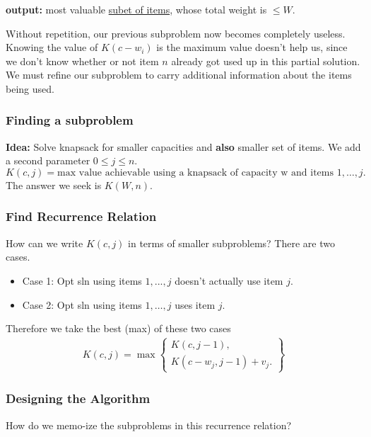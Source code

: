 \documentclass[12pt]{article}
\begin{document}
\textbf{output: } most valuable \underline{subet of items}, whose total weight is $\le W$.


Without repetition, our previous subproblem now becomes completely useless. Knowing the value of $K(c - w_i)$ is the maximum value doesn't help us, since we don't know whether or not item $n$ already got used up in this partial solution. We must refine our subproblem to carry additional information about the items being used.

\subsubsection{Finding a subproblem}
\textbf{Idea:} Solve knapsack for smaller capacities and \textbf{also} smaller set of items.
We add a second parameter $0 \le j \le n$.
$$
    K(c, j) = \text{max value achievable using a knapsack of capacity w and items } 1, \dots, j.
$$
The answer we seek is $K(W, n)$.
\subsubsection{Find Recurrence Relation}
How can we write $K(c, j)$ in terms of smaller subproblems? There are two cases.
\begin{itemize}
    \item Case 1: Opt sln using items $1, ..., j$ doesn't actually use item $j$.
    \item Case 2: Opt sln using items $1, \dots, j$ uses item $j$.
\end{itemize}
Therefore we take the best (max) of these two cases
\begin{align*}
    K(c, j) = \max \left\{
    \begin{array}{c}
        K(c, j - 1), \\
        K(c - w_j, j - 1) + v_j.
    \end{array}
    \right\}
\end{align*}

\subsubsection{Designing the Algorithm}
How do we memo-ize the subproblems in this recurrence relation?
\end{document}
